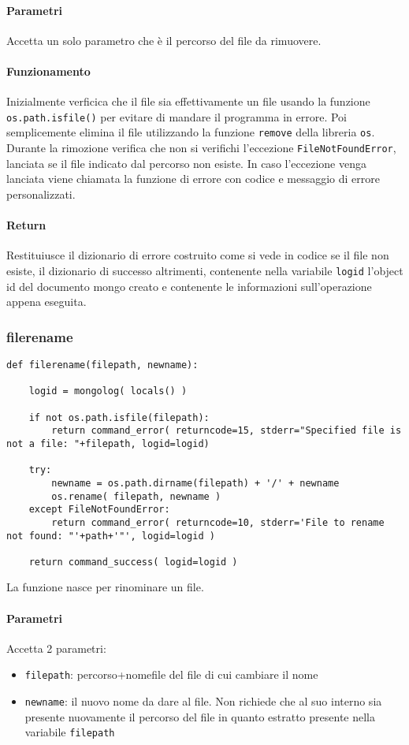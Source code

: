 \documentclass[11pt]{article}
\begin{document}
\paragraph{Parametri}
Accetta un solo parametro che è il percorso del file da rimuovere.
\paragraph{Funzionamento}
Inizialmente verficica che il file sia effettivamente un file usando la funzione \texttt{os.path.isfile()} per evitare di mandare il programma in errore.
Poi semplicemente elimina il file utilizzando la funzione \texttt{remove} della libreria \texttt{os}. Durante la rimozione
verifica che non si verifichi l'eccezione \texttt{FileNotFoundError}, lanciata se il file indicato dal percorso non esiste.
In caso l'eccezione venga lanciata viene chiamata la funzione di errore con codice e messaggio di errore personalizzati.
\paragraph{Return}
Restituiusce il dizionario di errore costruito come si vede in codice se il file non esiste, il dizionario di successo
altrimenti, contenente nella variabile \texttt{logid} l'object id del documento mongo creato e contenente le informazioni
sull'operazione appena eseguita.

\subsubsection{filerename}\label{filerename}
\begin{lstlisting}
def filerename(filepath, newname):
    
    logid = mongolog( locals() )

    if not os.path.isfile(filepath):
        return command_error( returncode=15, stderr="Specified file is not a file: "+filepath, logid=logid)

    try:
        newname = os.path.dirname(filepath) + '/' + newname
        os.rename( filepath, newname )
    except FileNotFoundError:
        return command_error( returncode=10, stderr='File to rename not found: "'+path+'"', logid=logid )

    return command_success( logid=logid )
\end{lstlisting}
La funzione nasce per rinominare un file.
\paragraph{Parametri}
Accetta 2 parametri:
\begin{itemize}
	\item{\texttt{filepath}: percorso+nomefile del file di cui cambiare il nome}
	\item{\texttt{newname}: il nuovo nome da dare al file. Non richiede che al suo interno sia presente nuovamente
		il percorso del file in quanto estratto presente nella variabile \texttt{filepath}}
\end{itemize}
\end{document}
